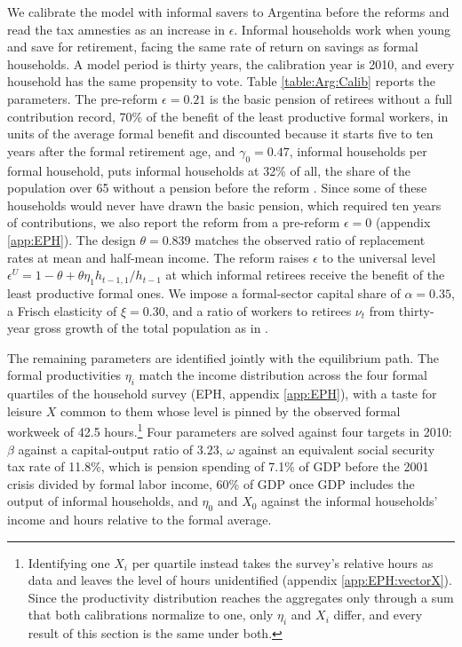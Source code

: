 We calibrate the model with informal savers to Argentina before the reforms and read the tax amnesties as an increase in $\epsilon$. Informal households work when young and save for retirement, facing the same rate of return on savings as formal households. A model period is thirty years, the calibration year is 2010, and every household has the same propensity to vote. Table \ref{table:Arg:Calib} reports the parameters. The pre-reform $\epsilon = 0.21$ is the basic pension of retirees without a full contribution record, 70\% of the benefit of the least productive formal workers, in units of the average formal benefit and discounted because it starts five to ten years after the formal retirement age, and $\gamma_0 = 0.47$, informal households per formal household, puts informal households at 32\% of all, the share of the population over 65 without a pension before the reform \parencite{Roffman}. Since some of these households would never have drawn the basic pension, which required ten years of contributions, we also report the reform from a pre-reform $\epsilon = 0$ (appendix \ref{app:EPH}). The design $\theta = 0.839$ matches the observed ratio of replacement rates at mean and half-mean income. The reform raises $\epsilon$ to the universal level $\epsilon^U = 1-\theta+\theta\eta_1h_{t-1,1}/h_{t-1}$ at which informal retirees receive the benefit of the least productive formal ones. We impose a formal-sector capital share of $\alpha = 0.35$, a Frisch elasticity of $\xi = 0.30$, and a ratio of workers to retirees $\nu_t$ from thirty-year gross growth of the total population as in \textcite{mkvss08}.

The remaining parameters are identified jointly with the equilibrium path. The formal productivities $\eta_i$ match the income distribution across the four formal quartiles of the household survey (EPH, appendix \ref{app:EPH}), with a taste for leisure $X$ common to them whose level is pinned by the observed formal workweek of 42.5 hours.\footnote{Identifying one $X_i$ per quartile instead takes the survey's relative hours as data and leaves the level of hours unidentified (appendix \ref{app:EPH:vectorX}). Since the productivity distribution reaches the aggregates only through a sum that both calibrations normalize to one, only $\eta_i$ and $X_i$ differ, and every result of this section is the same under both.} Four parameters are solved against four targets in 2010: $\beta$ against a capital-output ratio of $3.23$, $\omega$ against an equivalent social security tax rate of 11.8\%, which is pension spending of 7.1\% of GDP before the 2001 crisis divided by formal labor income, 60\% of GDP once GDP includes the output of informal households, and $\eta_0$ and $X_0$ against the informal households' income and hours relative to the formal average.


